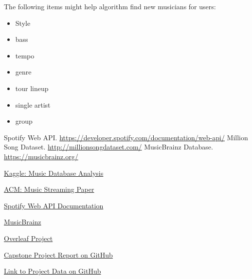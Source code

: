 \documentclass[runningheads]{llncs}
\begin{document}
The following items might help algorithm find new musicians for users:
\begin{itemize}
    \item Style
    \item bass
    \item tempo
    \item genre
    \item tour lineup
    \item single artist
    \item group
\end{itemize}

%
%



\begin{thebibliography}{4}
 Spotify Web API. \url{https://developer.spotify.com/documentation/web-api/}
 Million Song Dataset. \url{http://millionsongdataset.com/}
 MusicBrainz Database. \url{https://musicbrainz.org/}
\end{thebibliography}

\href{https://www.kaggle.com/code/caitlyna/music-database-analysis}{Kaggle: Music Database Analysis}

\href{https://dl.acm.org/doi/fullHtml/10.1145/3614419.3644002}{ACM: Music Streaming Paper}

\href{https://developer.spotify.com/documentation/web-api}{Spotify Web API Documentation}

\href{https://musicbrainz.org/}{MusicBrainz}

\href{https://www.overleaf.com/project/671af4c6d1ae0a41998555c6}{Overleaf Project}

\href{https://github.com/anythonyschomer/Capstone-Project-Report}{Capstone Project Report on GitHub}

\href{https://github.com/anythonyschomer/Capstone-Project-Data}{Link to Project Data on GitHub}
\end{document}
